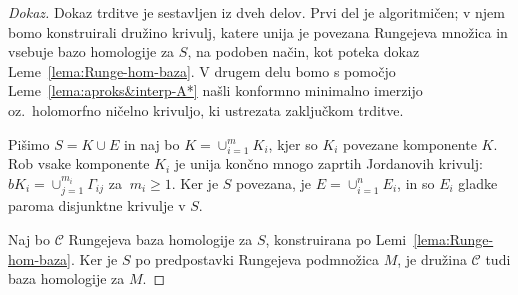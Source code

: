 \documentclass[12pt,a4paper,twoside]{article}
\theoremstyle{definition} %
\newenvironment{dokaz}[1][Dokaz]{\begin{proof}[#1]}{\end{proof}}
\theoremstyle{plain} %
\numberwithin{equation}{section}  %
\begin{document}
\begin{dokaz}
Dokaz trditve je sestavljen iz dveh delov. Prvi del je algoritmičen; v njem bomo konstruirali družino krivulj, katere unija je povezana Rungejeva množica in vsebuje bazo homologije za $S$, na podoben način, kot poteka dokaz Leme~\ref{lema:Runge-hom-baza}.
V drugem delu bomo s pomočjo Leme~\ref{lema:aproks&interp-A*} našli konformno minimalno imerzijo oz.~holomorfno ničelno krivuljo, ki ustrezata zaključkom trditve.

Pišimo $S = K \cup E$ in naj bo $K = \cup_{i=1}^{m}K_{i}$, kjer so $K_{i}$ povezane komponente $K$. Rob vsake komponente $K_{i}$ je unija končno mnogo zaprtih Jordanovih krivulj: $bK_{i} = \cup_{j=1}^{m_{i}}\Gamma_{ij}$ za $\ m_{i} \geq 1$.
Ker je $S$ povezana, je $E = \cup_{i=1}^{n}E_{i}$, in so $E_{i}$ gladke paroma disjunktne krivulje v $S$.

Naj bo $\mathcal{C}$ Rungejeva baza homologije za $S$, konstruirana po Lemi~\ref{lema:Runge-hom-baza}.
Ker je $S$ po predpostavki Rungejeva podmnožica $M$, je družina $\mathcal{C}$ tudi baza homologije za $M$.


\end{dokaz}
\end{document}
